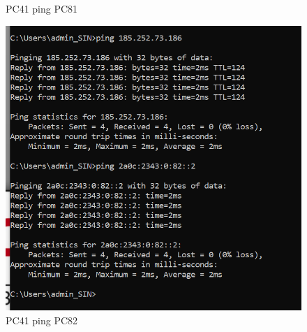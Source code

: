 \documentclass{article}
\begin{document}
\begin{figure}[!htp]
\begin{minipage}[b]{0.25\textwidth}
    \caption{PC41 ping PC81}
  \end{minipage}
  \hspace{0.8cm}
  \begin{minipage}[b]{0.25\textwidth}
    \includegraphics[width=\textwidth]{Arbeitsergebnisse/pc41/pc41_ping_pc82.PNG}
    \caption{PC41 ping PC82}
  \end{minipage}
\end{figure}
\end{document}
